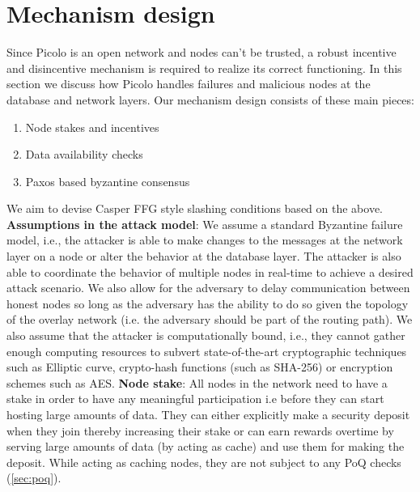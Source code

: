 \section{Mechanism design}
Since \textsf{Picolo} is an open network and nodes can't be trusted, a robust incentive and disincentive mechanism is required to realize its correct functioning. In this section we discuss how \textsf{Picolo} handles failures and malicious nodes at the database and network layers. Our mechanism design consists of these main pieces:
\begin{enumerate}
	\item Node stakes and incentives
	\item Data availability checks
	\item Paxos based byzantine consensus \cite{byzantine_paxos}
\end{enumerate}
We aim to devise Casper FFG \cite{casper_ffg} style slashing conditions based on the above.
\newline\newline
\textbf{Assumptions in the attack model}: We assume a standard Byzantine failure model, i.e., the attacker is able to make changes to the messages at the network layer on a node or alter the behavior at the database layer. The attacker is also able to coordinate the behavior of multiple nodes in real-time to achieve a desired attack scenario. We also allow for the adversary to delay communication between honest nodes so long as the adversary has the ability to do so given the topology of the overlay network (i.e. the adversary should be part of the routing path). We also assume that the attacker is computationally bound, i.e., they cannot gather enough computing resources to subvert state-of-the-art cryptographic techniques such as Elliptic curve, crypto-hash functions (such as SHA-256) or encryption schemes such as AES.
\newline\newline
\textbf{Node stake}: All nodes in the network need to have a stake in order to have any meaningful participation i.e before they can start hosting large amounts of data. They can either explicitly make a security deposit when they join thereby increasing their stake or can earn rewards overtime by serving large amounts of data (by acting as cache) and use them for making the deposit. While acting as caching nodes, they are not subject to any \textsf{PoQ} checks (\cref{sec:poq}). 
\newline\newline
